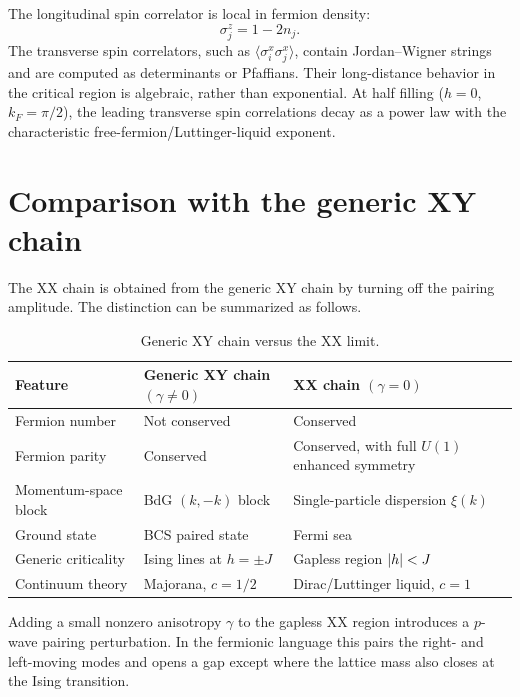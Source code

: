 The longitudinal spin correlator is local in fermion density:
\begin{equation}
\label{eq:xx-longitudinal-correlator-density}
    \sigma_j^z=1-2n_j.
\end{equation}
The transverse spin correlators, such as
$\langle\sigma_i^x\sigma_j^x\rangle$, contain Jordan--Wigner strings and are
computed as determinants or Pfaffians.  Their long-distance behavior in the
critical region is algebraic, rather than exponential.  At half filling
($h=0$, $k_F=\pi/2$), the leading transverse spin correlations decay as a power
law with the characteristic free-fermion/Luttinger-liquid exponent.

\section{Comparison with the generic XY chain}
\label{sec:xx-comparison-generic-xy}

The XX chain is obtained from the generic XY chain by turning off the pairing
amplitude.  The distinction can be summarized as follows.

\begin{table}[h]
\centering
\small
\setlength{\tabcolsep}{3pt}
\caption{Generic XY chain versus the XX limit.}
\label{tab:xx-vs-xy}
\begin{tabularx}{\textwidth}{L{0.25\textwidth}L{0.33\textwidth}Y}
\toprule
Feature & Generic XY chain $(\gamma\neq0)$ & XX chain $(\gamma=0)$ \\
\midrule
Fermion number & Not conserved & Conserved \\
Fermion parity & Conserved & Conserved, with full $U(1)$ enhanced symmetry \\
Momentum-space block & BdG $(k,-k)$ block & Single-particle dispersion $\xi(k)$ \\
Ground state & BCS paired state & Fermi sea \\
Generic criticality & Ising lines at $h=\pm J$ & Gapless region $\left|h\right|<J$ \\
Continuum theory & Majorana, $c=1/2$ & Dirac/Luttinger liquid, $c=1$ \\
\bottomrule
\end{tabularx}
\end{table}

Adding a small nonzero anisotropy $\gamma$ to the gapless XX region introduces a
$p$-wave pairing perturbation.  In the fermionic language this pairs the right-
and left-moving modes and opens a gap except where the lattice mass also closes
at the Ising transition.

